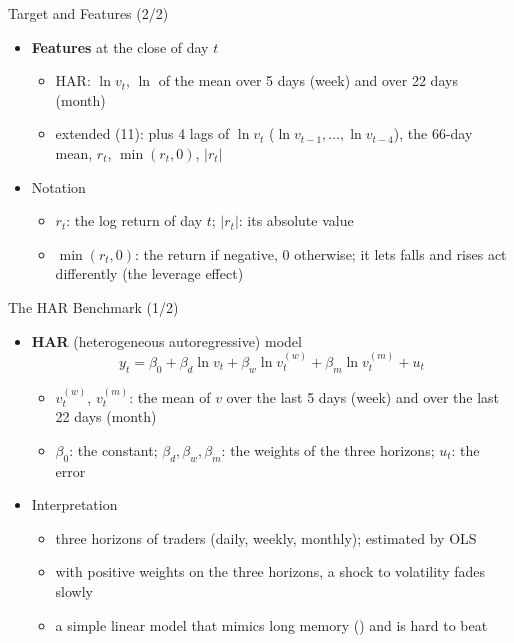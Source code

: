 \begin{frame}{Target and Features (2/2)}
\itemsize{\small}
\begin{itemize}
    \item \textbf{Features} at the close of day $t$
    \begin{itemize}
        \item HAR: $\ln v_t$, $\ln$ of the mean over 5 days (week) and over 22 days (month)
        \item extended (11): plus 4 lags of $\ln v_t$ ($\ln v_{t-1}, \dots, \ln v_{t-4}$), the 66-day mean, $r_t$, $\min(r_t, 0)$, $|r_t|$
    \end{itemize}
    \item Notation
    \begin{itemize}
        \item $r_t$: the log return of day $t$; $|r_t|$: its absolute value
        \item $\min(r_t, 0)$: the return if negative, 0 otherwise; it lets falls and rises act differently (the leverage effect)
    \end{itemize}
\end{itemize}
\end{frame}

\begin{frame}{The HAR Benchmark (1/2)}
\itemsize{\small}
\begin{itemize}
    \item \textbf{HAR} (heterogeneous autoregressive) model  \[ y_t = \beta_0 + \beta_d\ln v_t + \beta_w\ln v_t^{(w)} + \beta_m\ln v_t^{(m)} + u_t \]
    \begin{itemize}
        \item $v_t^{(w)}$, $v_t^{(m)}$: the mean of $v$ over the last 5 days (week) and over the last 22 days (month)
        \item $\beta_0$: the constant; $\beta_d, \beta_w, \beta_m$: the weights of the three horizons; $u_t$: the error
    \end{itemize}
    \item Interpretation
    \begin{itemize}
        \item three horizons of traders (daily, weekly, monthly); estimated by OLS
        \item with positive weights on the three horizons, a shock to volatility fades slowly
        \item a simple linear model that mimics long memory () and is hard to beat
    \end{itemize}
\end{itemize}
\end{frame}

